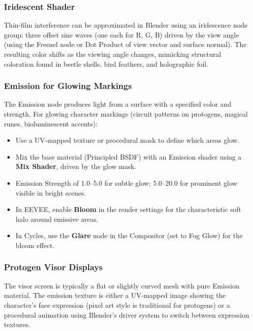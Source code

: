 \subsubsection{Iridescent Shader}

Thin-film interference can be approximated in Blender using an iridescence node group: three offset sine waves (one each for R, G, B) driven by the view angle (using the Fresnel node or Dot Product of view vector and surface normal). The resulting color shifts as the viewing angle changes, mimicking structural coloration found in beetle shells, bird feathers, and holographic foil.

\subsubsection{Emission for Glowing Markings}

The Emission node produces light from a surface with a specified color and strength. For glowing character markings (circuit patterns on protogens, magical runes, bioluminescent accents):

\begin{itemize}[leftmargin=2em]
  \item Use a UV-mapped texture or procedural mask to define which areas glow.
  \item Mix the base material (Principled BSDF) with an Emission shader using a \textbf{Mix Shader}, driven by the glow mask.
  \item Emission Strength of 1.0--5.0 for subtle glow; 5.0--20.0 for prominent glow visible in bright scenes.
  \item In EEVEE, enable \textbf{Bloom} in the render settings for the characteristic soft halo around emissive areas.
  \item In Cycles, use the \textbf{Glare} node in the Compositor (set to Fog Glow) for the bloom effect.
\end{itemize}

\subsubsection{Protogen Visor Displays}

The visor screen is typically a flat or slightly curved mesh with pure Emission material. The emission texture is either a UV-mapped image showing the character's face expression (pixel art style is traditional for protogens) or a procedural animation using Blender's driver system to switch between expression textures.

